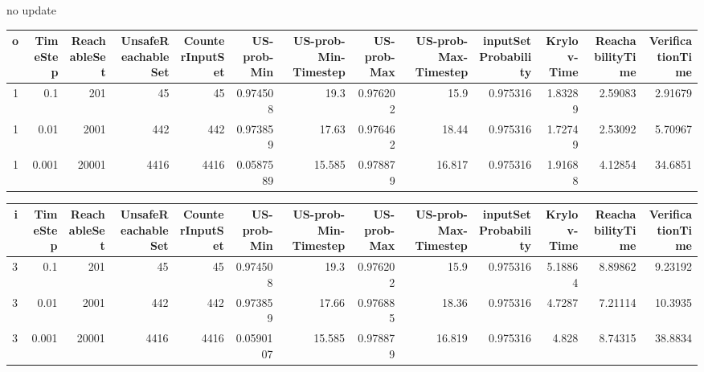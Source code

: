 no update
\begin{tabular}{rrrrrrrrrrrrr}
\hline
   o &   TimeStep &   ReachableSet &   UnsafeReachableSet &   CounterInputSet &   US-prob-Min &   US-prob-Min-Timestep &   US-prob-Max &   US-prob-Max-Timestep &   inputSet Probability &   Krylov-Time &   ReachabilityTime &   VerificationTime \\
\hline
   1 &      0.1   &            201 &                   45 &                45 &     0.974508  &                 19.3   &      0.976202 &                 15.9   &               0.975316 &       1.83289 &            2.59083 &            2.91679 \\
   1 &      0.01  &           2001 &                  442 &               442 &     0.973859  &                 17.63  &      0.976462 &                 18.44  &               0.975316 &       1.72749 &            2.53092 &            5.70967 \\
   1 &      0.001 &          20001 &                 4416 &              4416 &     0.0587589 &                 15.585 &      0.978879 &                 16.817 &               0.975316 &       1.91688 &            4.12854 &           34.6851  \\
\hline
\end{tabular}
\begin{tabular}{rrrrrrrrrrrrr}
\hline
   i &   TimeStep &   ReachableSet &   UnsafeReachableSet &   CounterInputSet &   US-prob-Min &   US-prob-Min-Timestep &   US-prob-Max &   US-prob-Max-Timestep &   inputSet Probability &   Krylov-Time &   ReachabilityTime &   VerificationTime \\
\hline
   3 &      0.1   &            201 &                   45 &                45 &     0.974508  &                 19.3   &      0.976202 &                 15.9   &               0.975316 &       5.18864 &            8.89862 &            9.23192 \\
   3 &      0.01  &           2001 &                  442 &               442 &     0.973859  &                 17.66  &      0.976885 &                 18.36  &               0.975316 &       4.7287  &            7.21114 &           10.3935  \\
   3 &      0.001 &          20001 &                 4416 &              4416 &     0.0590107 &                 15.585 &      0.978879 &                 16.819 &               0.975316 &       4.828   &            8.74315 &           38.8834  \\
\hline
\end{tabular}


